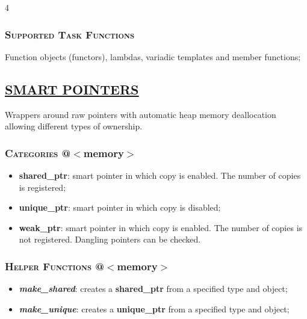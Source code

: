 \documentclass[10pt]{article}
\newcommand{\softseparator}{%
  \par\noindent{\color{RuleGray}\rule{\linewidth}{0.35pt}}\vspace{1pt}
}
\begin{document}
\begin{multicols*}{4}
{\subsubsection*{\textsc{Supported Task Functions}} 
\noindent
Function objects (functors), lambdas, variadic templates and member functions; 

}

\softseparator

{\color{Blue}
\subsection*{\href{https://en.cppreference.com/w/cpp/memory}{\underline{SMART POINTERS}}}	
\noindent
Wrappers around raw pointers with automatic heap memory deallocation allowing different types of ownership.

\subsubsection*{\textsc{Categories}  @$<$memory$>$} 
\begin{itemize}[leftmargin=*,topsep=0.25pt]
  \setlength\itemsep{-1.8pt}
	\item  {\textbf{shared\_ptr}}: smart pointer in which copy is enabled. The number of copies is registered;
	\item  {\textbf{unique\_ptr}}: smart pointer in which copy is disabled;
	\item  {\textbf{weak\_ptr}}: smart pointer in which copy is enabled. The number of copies is not registered. Dangling pointers can be checked.
\end{itemize}

\subsubsection*{\textsc{Helper Functions} @$<$memory$>$} 
\begin{itemize}[leftmargin=*,topsep=0.25pt]
  \setlength\itemsep{-1.8pt}
	\item  \emph{\textbf{make\_shared}}: creates a \textbf{shared\_ptr} from a specified type and object;
	\item  \emph{\textbf{make\_unique}}: creates a \textbf{unique\_ptr} from a specified type and object;
\end{itemize}

}
\end{multicols*}
\end{document}
